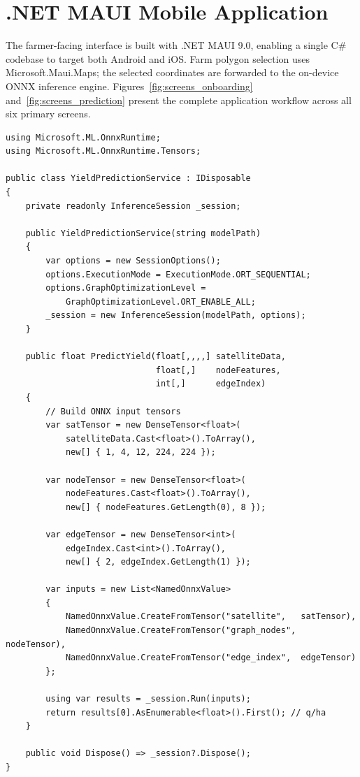 \section{.NET MAUI Mobile Application}

The farmer-facing interface is built with .NET MAUI 9.0, enabling a single C\# codebase to target both Android and iOS. Farm polygon selection uses Microsoft.Maui.Maps; the selected coordinates are forwarded to the on-device ONNX inference engine. Figures~\ref{fig:screens_onboarding} and~\ref{fig:screens_prediction} present the complete application workflow across all six primary screens.

\begin{lstlisting}[language={[Sharp]C}, caption={ONNX Runtime inference service in .NET MAUI (C\#).}]
using Microsoft.ML.OnnxRuntime;
using Microsoft.ML.OnnxRuntime.Tensors;

public class YieldPredictionService : IDisposable
{
    private readonly InferenceSession _session;

    public YieldPredictionService(string modelPath)
    {
        var options = new SessionOptions();
        options.ExecutionMode = ExecutionMode.ORT_SEQUENTIAL;
        options.GraphOptimizationLevel =
            GraphOptimizationLevel.ORT_ENABLE_ALL;
        _session = new InferenceSession(modelPath, options);
    }

    public float PredictYield(float[,,,,] satelliteData,
                              float[,]    nodeFeatures,
                              int[,]      edgeIndex)
    {
        // Build ONNX input tensors
        var satTensor = new DenseTensor<float>(
            satelliteData.Cast<float>().ToArray(),
            new[] { 1, 4, 12, 224, 224 });

        var nodeTensor = new DenseTensor<float>(
            nodeFeatures.Cast<float>().ToArray(),
            new[] { nodeFeatures.GetLength(0), 8 });

        var edgeTensor = new DenseTensor<int>(
            edgeIndex.Cast<int>().ToArray(),
            new[] { 2, edgeIndex.GetLength(1) });

        var inputs = new List<NamedOnnxValue>
        {
            NamedOnnxValue.CreateFromTensor("satellite",   satTensor),
            NamedOnnxValue.CreateFromTensor("graph_nodes", nodeTensor),
            NamedOnnxValue.CreateFromTensor("edge_index",  edgeTensor)
        };

        using var results = _session.Run(inputs);
        return results[0].AsEnumerable<float>().First(); // q/ha
    }

    public void Dispose() => _session?.Dispose();
}
\end{lstlisting}

